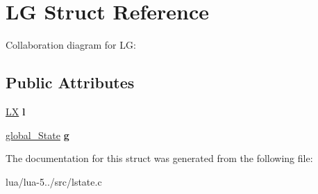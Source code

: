 \hypertarget{struct_l_g}{\section{L\+G Struct Reference}
\label{struct_l_g}
}


Collaboration diagram for L\+G\+:
\subsection*{Public Attributes}
\begin{DoxyCompactItemize}
\item 
\hypertarget{struct_l_g_a4d39b7fb87bf714c2d8f8850a23c61f5}{\hyperlink{struct_l_x}{L\+X} {\bfseries l}}\label{struct_l_g_a4d39b7fb87bf714c2d8f8850a23c61f5}

\item 
\hypertarget{struct_l_g_a3be25175d7c64b86674fdcc303b2148c}{\hyperlink{structglobal___state}{global\+\_\+\+State} {\bfseries g}}\label{struct_l_g_a3be25175d7c64b86674fdcc303b2148c}

\end{DoxyCompactItemize}


The documentation for this struct was generated from the following file\+:\begin{DoxyCompactItemize}
\item 
lua/lua-\/5../src/lstate.\+c\end{DoxyCompactItemize}
